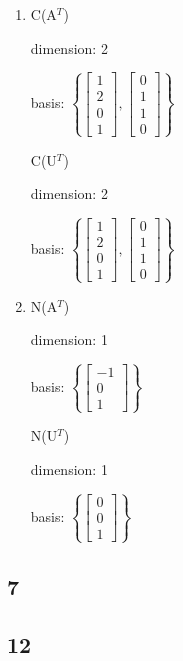 \documentclass[12pt,letterpaper]{article}
\begin{document}
\begin{enumerate}
        \item
          C(A$^T$)

          dimension: 2

          basis:
          $\left\{\begin{bmatrix}1 \\ 2 \\ 0 \\ 1\end{bmatrix}, \begin{bmatrix}0 \\ 1 \\ 1 \\ 0\end{bmatrix}\right\}$

          C(U$^T$)

          dimension: 2

          basis:
          $\left\{\begin{bmatrix}1 \\ 2 \\ 0 \\ 1\end{bmatrix}, \begin{bmatrix}0 \\ 1 \\ 1 \\ 0\end{bmatrix}\right\}$

        \item
          N(A$^T$)

          dimension: 1

          basis:
          $\left\{\begin{bmatrix}-1 \\ 0 \\ 1\end{bmatrix}\right\}$

          N(U$^T$)

          dimension: 1

          basis:
          $\left\{\begin{bmatrix}0 \\ 0 \\ 1\end{bmatrix}\right\}$
      \end{enumerate}
    \subsection*{7}
    \subsection*{12}
\end{document}
